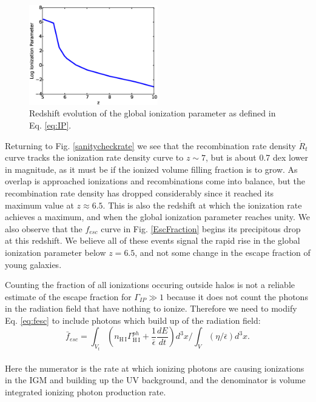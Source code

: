 \begin{figure}
	\includegraphics[width=0.5\textwidth]{Gamma.eps}
	\caption{Redshift evolution of the global ionization parameter as defined in Eq. \eqref{eq:IP}. }
	\label{IP}
\end{figure}

Returning to Fig. \ref{sanitycheckrate} we see that the recombination rate density $\dot{R}_t$ curve tracks the ionization rate density curve to $z\sim 7$, but is about 0.7 dex lower in magnitude, as it must be if the ionized volume filling fraction is to grow. As overlap is approached ionizations and recombinations come into balance, but the recombination rate density has dropped considerably since it reached its maximum value at $z \approx 6.5$. This is also the redshift at which the ionization rate achieves a maximum, and when the global ionization parameter reaches unity.  We also observe that the $f_{esc}$ curve in Fig. \ref{EscFraction} begins its precipitous drop at this redshift. We believe all of these events signal the rapid rise in the global ionization parameter below $z=6.5$, and not some change in the escape fraction of young galaxies. 

Counting the fraction of all ionizations occuring outside halos is not a reliable estimate of the escape fraction for $\Gamma_{IP} \gg 1$ because it does not count the photons in the radiation field that have nothing to ionize. Therefore we need to modify Eq. \eqref{eq:fesc} to include photons which build up of the radiation field: 
\begin{equation}
\bar{f}_{esc} = \int_{V_t}  (n_\mathrm{H\,I}\Gamma_\mathrm{H\,I}^{ph} + \frac{1}{\bar{\epsilon}}\frac{dE}{dt}) d^3x \bigg / \int_{V}  (\eta/\bar{\epsilon}) d^3x . 
\label{eq:fescimproved}
\end{equation}
\\Here the numerator is the rate at which ionizing photons are causing ionizations in the IGM and building up the UV background, and the denominator is volume integrated ionizing photon production rate. 

